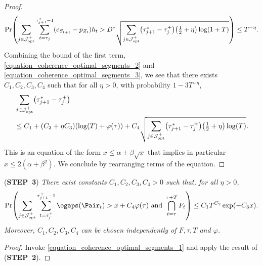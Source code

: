 \documentclass[preprint,cleveref,12pt]{colt2025}
\DeclarePairedDelimiter{\parens}{(}{)}	%
\def\STEP#1{(\strong{STEP~#1})}
\newcommand{\strong}[1]{\textbf{#1}}
\begin{document}
\begin{proof}
        \begin{equation}
            \label{equation_coherence_optimal_segments_3}
            \Pr \parens*{
                \sum_{j \in \mathcal{J}^+_\mathrm{opt}} 
                \sum_{t=\tau_j}^{\tau_{j+1}^*-1}
                (e_{S_{t+1}} - p_{Z_t}) h_t
                > 
                D^* \sqrt{
                    \sum_{j \in \mathcal{J}^+_\mathrm{opt}}
                    \parens*{\tau_{j+1}^* - \tau_j^+}
                    \parens*{\tfrac 12 + \eta} \log(1+T)
                }
            }
            \le
            T^{-\eta}
            .
        \end{equation}
        Combining the bound of the first term, \eqref{equation_coherence_optimal_segments_2} and \eqref{equation_coherence_optimal_segments_3}, we see that there exists $C_1, C_2, C_3, C_4$ such that for all $\eta > 0$, with probability $1 - 3T^{-\eta}$, 
        \begin{align*}
            & \sum_{j \in \mathcal{J}^+_\mathrm{opt}}
            \parens*{\tau_{j+1}^* - \tau_j^+}
            \\
            & \le
            C_1 + (C_2 + \eta C_3) (\log(T) + \varphi(\tau))
            + C_4 \sqrt{\sum_{j\in\mathcal{J}^+_\mathrm{opt}} \parens*{\tau_{j+1}^* - \tau_j^+} \parens*{\tfrac 12 + \eta} \log(T)}.
        \end{align*}
        This is an equation of the form $x \le \alpha + \beta \sqrt{x}$ that implies in particular $x \le 2(\alpha + \beta^2)$. 
        We conclude by rearranging terms of the equation. 
    \end{proof}

    \noindent
    \STEP{3}
    \textit{
        There exist constants $C_1, C_2, C_3, C_4 > 0$ such that, for all $\eta > 0$, 
        \begin{equation}
            \Pr \parens*{
                \sum_{j \in \mathcal{J}^+_\mathrm{opt}}
                \sum_{t=\tau_j^+}^{\tau_{j+1}^+-1}
                \ogaps(\Pair_t)
                >
                x + C_4 \varphi(\tau)
                \text{~and~}
                \bigcap_{t = \tau}^{\tau+T} F_t
            }
            \le
            C_1 T^{C_2} \exp(-C_3x)
            .
        \end{equation}
        Moreover, $C_1, C_2, C_3, C_4$ can be chosen independently of $F, \tau, T$ and $\varphi$. 
    }
    \medskip
    \begin{proof}
        Invoke \eqref{equation_coherence_optimal_segments_1} and apply the result of \STEP{2}.
    \end{proof}
\end{document}

